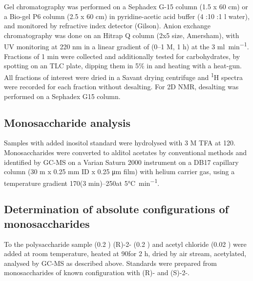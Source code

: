 		Gel chromatography was performed on a Sephadex G-15 column (1.5 x 60 \si{\centi\meter}) or a Bio-gel P6 column (2.5 x 60 \si{\centi\meter}) in pyridine-acetic acid buffer (4 \millilitre:10 \millilitre:1 \si{\litre} water), and monitored by refractive index detector (Gilson). Anion exchange chromatography was done on an Hitrap Q column (2x5 \millilitre size, Amersham), with \ac{UV} monitoring at 220 nm in a linear gradient of  (0--1 M, 1 h) at the 3 \si{\milli\litre\per\minute}. Fractions of 1 min were collected and additionally tested for carbohydrates, by spotting on an  \ac{TLC} plate, dipping them in 5\%  in  and heating with a heat-gun. All fractions of interest were dried in a Savant drying centrifuge and \textsuperscript{1}H spectra were recorded for each fraction without desalting. For 2D \ac{NMR}, desalting was performed on a Sephadex G15 column. 

	\subsection{Monosaccharide analysis} %
	\label{sub:monosaccharide_analysis}

		Samples with added inositol standard were hydrolysed with 3 M \ac{TFA} at 120\cel. Monosaccharides were converted to alditol acetates by conventional methods and identified by \ac{GC-MS} on a Varian Saturn 2000 instrument on a DB17 capillary column (30 m x 0.25 \si{\milli\meter} ID x 0.25 \si{\micro\meter} film) with helium carrier gas, using a temperature gradient 170\cel (3 min)--250\cel at 5\si{\degreeCelsius\per\minute}.

	\subsection{Determination of absolute configurations of monosaccharides} %
	\label{sub:determination_of_absolute_configurations_of_monosaccharides}

		To the polysaccharide sample (0.2 \milligram) (R)-2- (0.2 \millilitre) and acetyl chloride (0.02 \millilitre) were added at room temperature, heated at 90\cel for 2 h, dried by air stream, acetylated, analysed by \ac{GC-MS} as described above. Standards were prepared from monosaccharides of known configuration with (R)- and (S)-2-.

